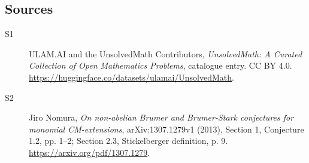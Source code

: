 \documentclass[11pt]{article}
\begin{document}
\subsection{Sources}
\begin{description}
\item[\hypertarget{source:statement:1}{S1}] ULAM.AI and the UnsolvedMath Contributors, \emph{UnsolvedMath: A Curated Collection of Open Mathematics Problems}, catalogue entry. CC BY 4.0. \url{https://huggingface.co/datasets/ulamai/UnsolvedMath}.
\item[\hypertarget{source:statement:2}{S2}] Jiro Nomura, \emph{On non-abelian Brumer and Brumer-Stark conjectures for monomial CM-extensions}, arXiv:1307.1279v1 (2013), Section 1, Conjecture 1.2, pp. 1--2; Section 2.3, Stickelberger definition, p. 9. \url{https://arxiv.org/pdf/1307.1279}.
\end{description}
\label{end:statement}
\end{document}
